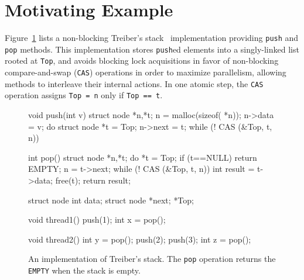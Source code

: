 
\section{Motivating Example}
\label{sec:motivation}

Figure~\ref{fig:treiber} lists a non-blocking Treiber's stack~\cite{Treiber'86}
implementation providing {\tt push} and {\tt pop} methods. This implementation
stores {\tt push}ed elements into a singly-linked list rooted at {\tt Top}, and
avoids blocking lock acquisitions in favor of non-blocking compare-and-swap
({\tt CAS}) operations in order to maximize parallelism, allowing methods to
interleave their internal actions. In one atomic step, the {\tt CAS} operation
assigns {\tt Top = n} only if {\tt Top == t}.


\begin{figure}[t]
  \scriptsize
  \begin{minipage}[t]{45mm}
    \begin{program}
void push(int v) {
  struct node *n,*t;
  n = malloc(sizeof( *n));
  n->data = v;
  do {
    struct node *t = Top;
    n->next = t;
  } while (! CAS (&Top, t, n))
}

int pop() {
  struct node *n,*t;
  do {
    *t = Top;
    if (t==NULL) return EMPTY;
    n = t->next;
  } while (! CAS (&Top, t, n))
  int result = t->data;
  free(t);
  return result;
}
    \end{program}
  \end{minipage}
  \begin{minipage}[t]{35mm}
    \begin{program}
struct node {
  int data;
  struct node *next;
} *Top;  

void thread1() {
  push(1);
  int x = pop();
}

void thread2() {
  int y = pop();
  push(2);
  push(3);
  int z = pop();
}
    \end{program}
  \end{minipage}

  \caption{An implementation of Treiber's stack. The {\tt pop} operation
  returns the {\tt EMPTY} when the stack is empty.}
  \label{fig:treiber}
\end{figure}

